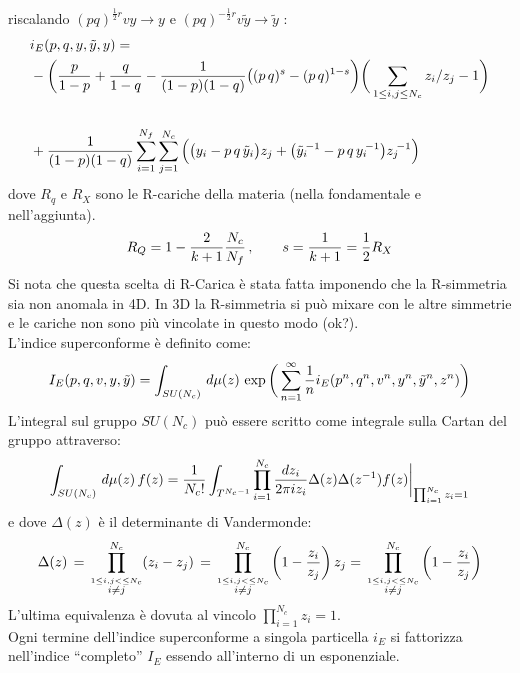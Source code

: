 \documentclass[a4paper,12pt]{report}
\begin{document}
riscalando $ (pq)^{ \frac{1}{2} r }v y \rightarrow y$ e  
$ (pq)^{- \frac{1}{2} r } v \tilde y \rightarrow \tilde y$  :
\begin{equation}
\begin{aligned}
&i_E(p,q,y,{\tilde y},y) =\\ 
&{} -\bigg({p\over 1-p}+{q\over 1-q } -{1 \over (1-p)(1-q)}
\big((p\,q)^{s}- (p\,q)^{1-s}\bigg)
\bigg(\sum_{1\leq i,j\leq N_c}z_i/z_j-1\bigg)\cr\\ 
&{}+{1\over
(1-p)(1-q)}\sum_{i=1}^{N_f}\sum_{j=1}^{N_c}\Big(\big (y_i-p\,q\,{\tilde y}_i \big )z_j
+ \big ({\tilde y}_i{\!}^{-1}-p\,q\,y_i{\!}^{-1} \big )z_j{\!}^{-1}\Big)\, 
\end{aligned}
\end{equation}
dove $R_q$ e $R_X$ sono le R-cariche della materia (nella fondamentale e nell'aggiunta).
\begin{equation}
R_Q =1-{2\over k+1}{N_c\over N_f} \, , \qquad s = {1 \over k+1} = {1 \over 2 } R_X  \\ 
\end{equation}
Si nota che questa scelta di R-Carica è stata fatta imponendo che la R-simmetria sia non anomala in 4D. In 3D la R-simmetria si può mixare con le altre simmetrie e le cariche non sono più vincolate in questo modo (ok?).\\
 L'indice superconforme è definito come:
 \begin{equation*}
 I_E (p,q,v, y,\tilde y) = \int_{SU(N_c)}\, d \mu(z) \, \exp \bigg( \sum_{n=1}^{\infty} {1 \over n} i_E (p^n,q^n,v^n, y^n,\tilde y^n,z^n) \bigg)
 \end{equation*}
 L'integral sul gruppo $SU(N_c)$ può essere scritto come integrale sulla Cartan del gruppo attraverso:
 \begin{equation}
  \int_{SU(N_c)}\, d \mu(z) \, f(z) = {1 \over N_c!} \int_{T^{N_c-1}} \prod_{i=1}^{N_c } 
  { d z_i \over { 2 \pi i z_i} } \Delta (z) \Delta (z^{-1}) f(z) \bigg \rvert_{\prod_{i=1}^{N_c} z_i = 1} 
 \end{equation}
 e dove $\Delta (z) $ è il determinante di Vandermonde:
 $$
 \Delta (z ) \, = \, \prod_{ \overset{1 \leq i,j< \leq N_c} { i \neq j}}^{N_c} ( z_i - z_j) \, = \,  \prod_{ \overset{1 \leq i,j< \leq N_c} { i \neq j}}^{N_c}\bigg ( 1 - {z_i \over  z_j } \bigg) \, z_j = \,  \prod_{ \overset{1 \leq i,j< \leq N_c} { i \neq j}}^{N_c}\bigg ( 1 - {z_i \over  z_j } \bigg)
 $$
 L'ultima equivalenza è dovuta al vincolo $ \prod_{i=1}^{N_c} z_i = 1$.
 \\
 Ogni termine dell'indice superconforme a singola particella $i_E$ si fattorizza nell'indice ``completo'' $I_E$ essendo all'interno di un esponenziale.\\
\end{document}
